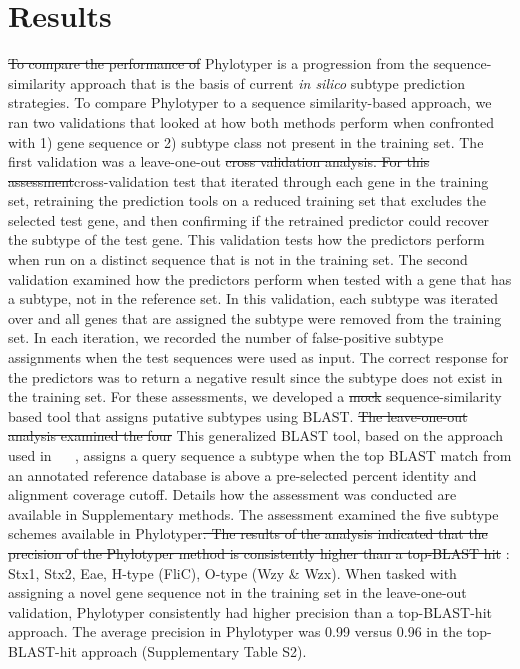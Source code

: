 \documentclass{bioinfo}
\providecommand{\DIFadd}[1]{{\protect\color{red}#1}} %
\providecommand{\DIFdel}[1]{{\protect\color{red}\sout{#1}}}                      %
\providecommand{\DIFaddbegin}{} %
\providecommand{\DIFaddend}{} %
\providecommand{\DIFdelbegin}{} %
\providecommand{\DIFdelend}{} %
\begin{document}
\section{Results}

\DIFdelbegin \DIFdel{To compare the performance of }\DIFdelend \DIFaddbegin \DIFadd{Phylotyper is a progression from the sequence-similarity approach that is the basis of current }\textit{\DIFadd{in silico}} \DIFadd{subtype prediction strategies.
To compare }\DIFaddend Phylotyper to a sequence similarity-based approach, we ran \DIFaddbegin \DIFadd{two validations that looked at how both methods perform when confronted with 1) gene sequence or 2) subtype class not present in the training set.
The first validation was }\DIFaddend a leave-one-out \DIFdelbegin \DIFdel{cross validation analysis.
For this assessment}\DIFdelend \DIFaddbegin \DIFadd{cross-validation test that iterated through each gene in the training set, retraining the prediction tools on a reduced training set that excludes the selected test gene, and then confirming if the retrained predictor could recover the subtype of the test gene.
This validation tests how the predictors perform when run on a distinct sequence that is not in the training set.
The second validation examined how the predictors perform when tested with a gene that has a subtype, not in the reference set.
In this validation, each subtype was iterated over and all genes that are assigned the subtype were removed from the training set.
In each iteration, we recorded the number of false-positive subtype assignments when the test sequences were used as input.
The correct response for the predictors was to return a negative result since the subtype does not exist in the training set.
For these assessments}\DIFaddend , we developed a \DIFdelbegin \DIFdel{mock }\DIFdelend sequence-similarity based tool that assigns putative subtypes using BLAST.
\DIFdelbegin \DIFdel{The leave-one-out analysis examined the four }\DIFdelend \DIFaddbegin \DIFadd{This generalized BLAST tool, based on the approach used in \mbox{%
\citep{Joensen2015}
}%
, assigns a query sequence a subtype when the top BLAST match from an annotated reference database is above a pre-selected percent identity and alignment coverage cutoff.
Details how the assessment was conducted are available in Supplementary methods.
The assessment examined the five }\DIFaddend subtype schemes available in Phylotyper\DIFdelbegin \DIFdel{. The results of the analysis indicated that the precision of the Phylotyper method is consistently higher than a top-BLAST hit }\DIFdelend \DIFaddbegin \DIFadd{: Stx1, Stx2, Eae, H-type (FliC), O-type (Wzy }\& \DIFadd{Wzx).
When tasked with assigning a novel gene sequence not in the training set in the leave-one-out validation, Phylotyper consistently had higher precision than a top-BLAST-hit approach.
The average precision in Phylotyper was 0.99 versus 0.96 in the top-BLAST-hit }\DIFaddend approach (Supplementary Table S2).
\end{document}
